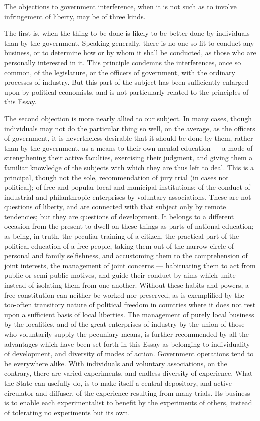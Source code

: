 \documentclass[12pt]{report}
\begin{document}
The objections to government interference, when it is not such as to involve infringement of liberty, may be of three kinds.

The first is, when the thing to be done is likely to be better done by individuals than by the government. Speaking generally, there is no one so fit to conduct any business, or to determine how or by whom it shall be conducted, as those who are personally interested in it. This principle condemns the interferences, once so common, of the legislature, or the officers of government, with the ordinary processes of industry. But this part of the subject has been sufficiently enlarged upon by political economists, and is not particularly related to the principles of this Essay.

The second objection is more nearly allied to our subject. In many cases, though individuals may not do the particular thing so well, on the average, as the officers of government, it is nevertheless desirable that it should be done by them, rather than by the government, as a means to their own mental education — a mode of strengthening their active faculties, exercising their judgment, and giving them a familiar knowledge of the subjects with which they are thus left to deal. This is a principal, though not the sole, recommendation of jury trial (in cases not political); of free and popular local and municipal institutions; of the conduct of industrial and philanthropic enterprises by voluntary associations. These are not questions of liberty, and are connected with that subject only by remote tendencies; but they are questions of development. It belongs to a different occasion from the present to dwell on these things as parts of national education; as being, in truth, the peculiar training of a citizen, the practical part of the political education of a free people, taking them out of the narrow circle of personal and family selfishness, and accustoming them to the comprehension of joint interests, the management of joint concerns — habituating them to act from public or semi-public motives, and guide their conduct by aims which unite instead of isolating them from one another. Without these habits and powers, a free constitution can neither be worked nor preserved, as is exemplified by the too-often transitory nature of political freedom in countries where it does not rest upon a sufficient basis of local liberties. The management of purely local business by the localities, and of the great enterprises of industry by the union of those who voluntarily supply the pecuniary means, is further recommended by all the advantages which have been set forth in this Essay as belonging to individuality of development, and diversity of modes of action. Government operations tend to be everywhere alike. With individuals and voluntary associations, on the contrary, there are varied experiments, and endless diversity of experience. What the State can usefully do, is to make itself a central depository, and active circulator and diffuser, of the experience resulting from many trials. Its business is to enable each experimentalist to benefit by the experiments of others, instead of tolerating no experiments but its own.
\end{document}
